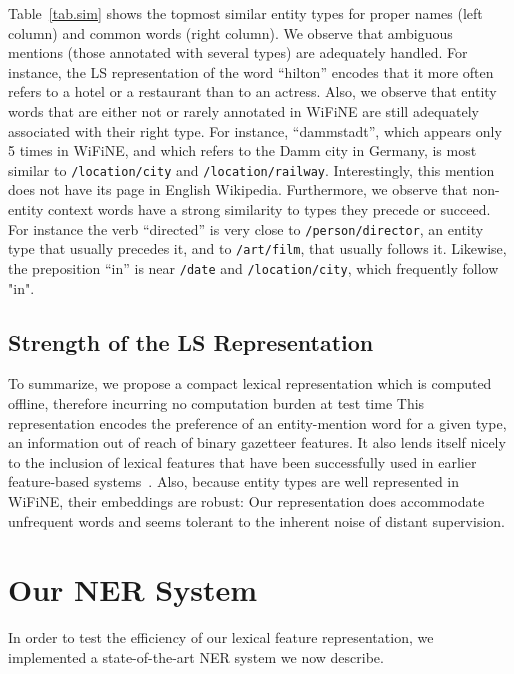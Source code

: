 \documentclass[11pt]{article}
\newcommand{\lr}{\textsc{LS}}
\newcommand{\wifine}{WiFiNE}
\begin{document}
	
	Table~\ref{tab.sim} shows the topmost similar entity types for proper names (left column) and common words (right column). We observe that ambiguous mentions (those annotated with several types) are adequately handled. For instance, the \lr{} representation of the word \enquote{hilton} encodes that it more often refers to a hotel or a restaurant than to an actress. Also, we observe that entity words that are either not or rarely annotated in \wifine{} are still adequately associated with their right type. For instance, \enquote{dammstadt}, which appears only 5 times in \wifine, and which refers to the Damm city in Germany, is most similar to \texttt{/location/city} and \texttt{/location/railway}. Interestingly, this mention does not have its page in English Wikipedia.	
	Furthermore, we observe that non-entity context words have a strong similarity to types they precede or succeed. For instance the verb \enquote{directed} is very close to \texttt{/person/director}, an entity type that usually precedes it, and to \texttt{/art/film}, that usually follows it. Likewise, the preposition \enquote{in} is near \texttt{/date} and \texttt{/location/city}, which frequently follow "in".
	
	
	\subsection{Strength of the \lr{} Representation}

	To summarize, we propose a compact lexical representation which is computed offline, therefore incurring no computation burden at test time This representation encodes the preference of an entity-mention word for a given type, an information out of reach of binary gazetteer features. It also lends itself nicely to the inclusion of lexical features that have been successfully used in earlier feature-based systems~\cite{ratinov2009design,luo-2015}. Also, because entity types are well represented in \wifine, their embeddings are robust: Our representation does accommodate unfrequent words and seems tolerant to the inherent noise of distant supervision.
	
	\section{Our NER System}
	\label{sec:system}
	
	In order to test the efficiency of our lexical feature representation, we implemented a state-of-the-art NER system we now describe.
	
\end{document}
